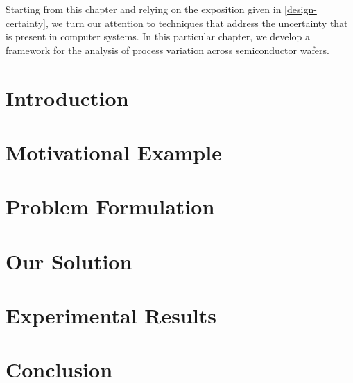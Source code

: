 Starting from this chapter and relying on the exposition given in
\cref{design-certainty}, we turn our attention to techniques that address the
uncertainty that is present in computer systems. In this particular chapter, we
develop a framework for the analysis of process variation across semiconductor
wafers.

\section{Introduction}

\section{Motivational Example}

\section{Problem Formulation}

\section{Our Solution}

\section{Experimental Results}

\section{Conclusion}
